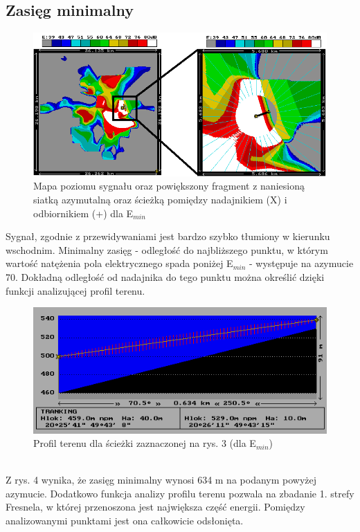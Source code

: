 \documentclass[12pt, a4paper, oneside]{article}
\begin{document}
\subsection{Zasięg minimalny}
\begin{figure}[h]
\centering
\includegraphics[scale=0.9]{pics/mapki/f2.png}
\caption{Mapa poziomu sygnału oraz powiększony fragment z naniesioną siatką azymutalną oraz ścieżką pomiędzy nadajnikiem (X) i odbiornikiem (+) dla E$_{min}$}
\end{figure}
\indent Sygnał, zgodnie z przewidywaniami jest bardzo szybko tłumiony w kierunku wschodnim. Minimalny zasięg - odległość do najbliższego punktu, w którym wartość natężenia pola elektrycznego spada poniżej E$_{min}$ - występuje na azymucie 70\textdegree. Dokładną odległość od nadajnika do tego punktu można określić dzięki funkcji analizującej profil terenu.
\begin{figure}[h]
\centering
\includegraphics[scale=1.1]{pics/mapki/f3.png}
\caption{Profil terenu dla ścieżki zaznaczonej na rys. 3 (dla E$_{min}$)}
\end{figure}\\
\indent Z rys. 4 wynika, że zasięg minimalny wynosi 634 m na podanym powyżej azymucie. Dodatkowo funkcja analizy profilu terenu pozwala na zbadanie 1. strefy Fresnela, w której przenoszona jest największa część energii. Pomiędzy analizowanymi punktami jest ona całkowicie odsłonięta.
\clearpage
\end{document}
